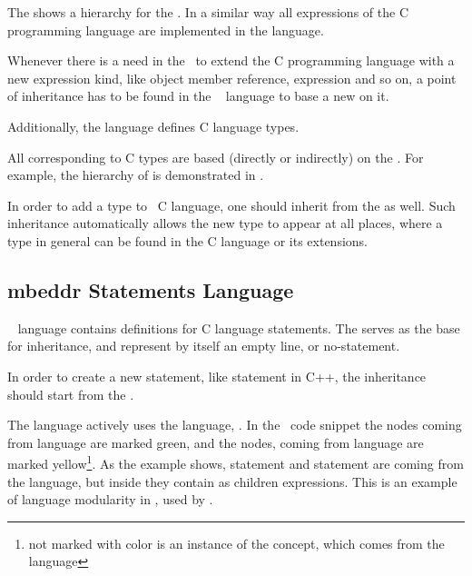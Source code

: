 
The  shows a hierarchy for the  . In a similar way all expressions of the 
C programming language are implemented in the  language.

Whenever there is a need in the \cpppl\ to extend the C programming language with a new expression kind, like 
object member reference,  expression and so on, a point of inheritance has to be found in the 
\mbdr\  language to base a new  on it.

Additionally, the  language defines  C language types. 


All  corresponding to C types are based (directly or indirectly) on the  .
For example, the hierarchy of   is demonstrated in . 

In order to add a type to \mbdr\ C language, one should inherit from the   as well.
Such inheritance automatically allows the new type to appear at all places, where a type in general can be found
in the C language or its extensions.


\subsection{mbeddr Statements Language}

\mbdr\  language contains definitions for C language statements. The   serves as the
base for inheritance, and represent by itself an empty line, or no-statement.

In order to create a new statement, like  statement in C++, the inheritance should start from the  .


The  language actively uses the  language, . In the \mbdr\ code snippet
the nodes coming from  language are marked green, and the nodes, coming from  language are
marked yellow\footnote{not marked with color is an instance of the  concept, which comes from the  language}. As the example shows, 
 statement and  statement are coming from the  language,
but inside they contain as children expressions. This is an example of language modularity in \jbmps, used by \mbdr.

